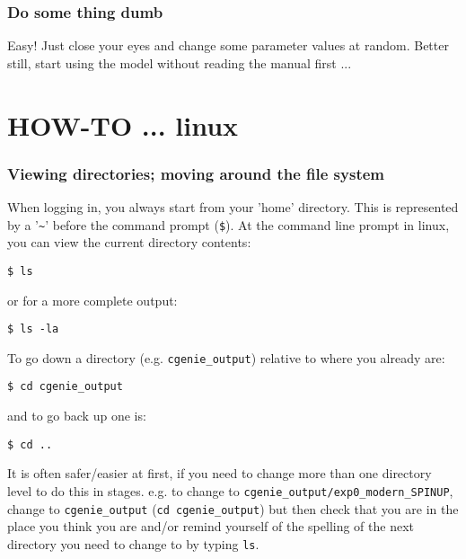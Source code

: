 \documentclass[11pt,fleqn]{book} %
\begin{document}
%
\subsubsection{Do some thing dumb}\label{Do some thing dumb}

\vspace{1mm}
Easy! Just close your eyes and change some parameter values at random. Better still, start using the model without reading the manual first ...


\newpage


\section{HOW-TO ... linux}\label{how-to-linux}
\vspace{2mm}

%
\subsubsection{Viewing directories; moving around the file system}

When logging in, you always start from your 'home' directory. This is represented by a '\texttt{\~}'
before the command prompt (\texttt{\$}).
At the command line prompt in linux, you can view the current directory contents:
\begin{verbatim}
$ ls
\end{verbatim}
or for a more complete output:
\begin{verbatim}
$ ls -la
\end{verbatim}
To go down a directory (e.g. \texttt{cgenie\_output}) relative to where you already are:
\begin{verbatim}
$ cd cgenie_output
\end{verbatim}
and to go back up one is:
\begin{verbatim}
$ cd ..
\end{verbatim}

It is often safer/easier at first, if you need to change more than one directory level to do this in stages. e.g. to change to \texttt{cgenie\_output/exp0\_modern\_SPINUP}, change to \texttt{cgenie\_output} (\texttt{cd cgenie\_output}) but then check that you are in the place you think you are and/or remind yourself of the spelling of the next directory you need to change to by typing \texttt{ls}.
\end{document}
